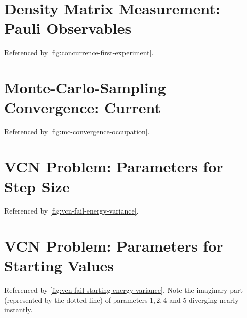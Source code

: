 \begin{minipage}{\textwidth}
    \section{Density Matrix Measurement: Pauli Observables} %
        \label{appendix:pauli-measurements}
        Referenced by \autoref{fig:concurrence-first-experiment}.\\
        \vbox{
        }
\end{minipage}

\begin{minipage}{\textwidth}
    \section{Monte-Carlo-Sampling Convergence: Current} %
        \label{appendix:mc-convergence-spin-current}
        Referenced by \autoref{fig:mc-convergence-occupation}.\\
        \vbox{
        }
\end{minipage}

\begin{minipage}{\textwidth}
    \section{VCN Problem: Parameters for Step Size} %
        \label{appendix:vcn-fail-parameters}
        Referenced by \autoref{fig:vcn-fail-energy-variance}.\\
        \vbox{
        }
\end{minipage}

\begin{minipage}{\textwidth}
    \section{VCN Problem: Parameters for Starting Values} %
        \label{appendix:vcn-fail-starting-parameters}
        Referenced by \autoref{fig:vcn-fail-starting-energy-variance}. Note the imaginary part (represented by the dotted line) of parameters 1,\,2,\,4 and 5 diverging nearly instantly.\\
        \vbox{
        }
\end{minipage}

